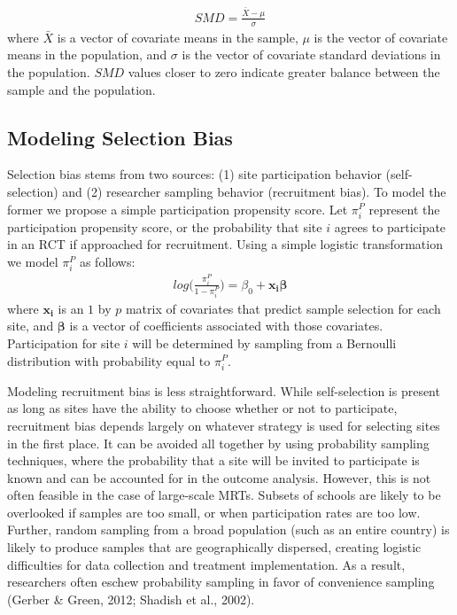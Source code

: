\documentclass[
  english,
  man,floatsintext]{apa6}
\begin{document}
\begin{align} \label{eq:SMD}
SMD = \frac{\bar{X}-\mu}{\sigma}
\end{align}
where \(\bar{X}\) is a vector of covariate means in the sample, \(\mu\) is the vector of covariate means in the population, and \(\sigma\) is the vector of covariate standard deviations in the population. \(SMD\) values closer to zero indicate greater balance between the sample and the population.

\hypertarget{modeling-selection-bias}{%
\subsection{Modeling Selection Bias}\label{modeling-selection-bias}}

Selection bias stems from two sources: (1) site participation behavior (self-selection) and (2) researcher sampling behavior (recruitment bias). To model the former we propose a simple participation propensity score. Let \(\pi^P_i\) represent the participation propensity score, or the probability that site \(i\) agrees to participate in an RCT if approached for recruitment. Using a simple logistic transformation we model \(\pi^P_i\) as follows:
\begin{align} 
\label{eq:RGM}
log\bigg(\frac{\pi^P_i}{1 - \pi^P_i}\bigg) = \beta_0 + \boldsymbol{x_i \beta}
\end{align}
where \(\boldsymbol{x_i}\) is an \(1\) by \(p\) matrix of covariates that predict sample selection for each site, and \(\boldsymbol{\beta}\) is a vector of coefficients associated with those covariates. Participation for site \(i\) will be determined by sampling from a Bernoulli distribution with probability equal to \(\pi^P_i\).

Modeling recruitment bias is less straightforward. While self-selection is present as long as sites have the ability to choose whether or not to participate, recruitment bias depends largely on whatever strategy is used for selecting sites in the first place. It can be avoided all together by using probability sampling techniques, where the probability that a site will be invited to participate is known and can be accounted for in the outcome analysis. However, this is not often feasible in the case of large-scale MRTs. Subsets of schools are likely to be overlooked if samples are too small, or when participation rates are too low. Further, random sampling from a broad population (such as an entire country) is likely to produce samples that are geographically dispersed, creating logistic difficulties for data collection and treatment implementation. As a result, researchers often eschew probability sampling in favor of convenience sampling (Gerber \& Green, 2012; Shadish et al., 2002).
\end{document}
